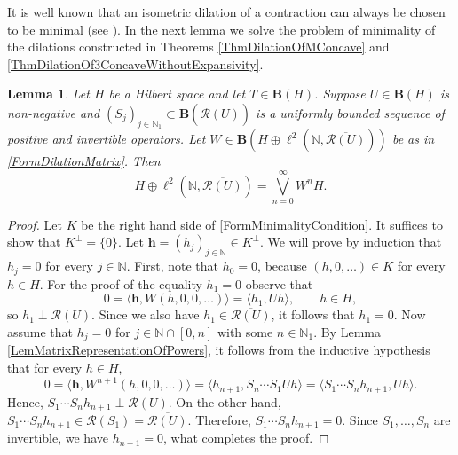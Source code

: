 \documentclass{amsart}
\newtheorem{lemma}[theorem]{Lemma}
\theoremstyle{definition}
\numberwithin{equation}{section}
\begin{document}
It is well known that an isometric dilation of a contraction can always be chosen to be minimal (see \cite[Chapter I, Theorem 4.1]{SzNagyHarmonicAnalysisOfOperators}). In the next lemma we solve the problem of minimality of the dilations constructed in Theorems \ref{ThmDilationOfMConcave} and \ref{ThmDilationOf3ConcaveWithoutExpansivity}.
\begin{lemma}
    \label{LemMinimalDilations}
    Let $ H $ be a Hilbert space and let $ T\in \mathbf{B}(H) $. Suppose $ U\in \mathbf{B}(H) $ is non-negative and $ (S_{j})_{j\in \mathbb{N}_{1}}\subset \mathbf{B}(\overline{\mathcal{R}(U)}) $ is a uniformly bounded sequence of positive and invertible operators. Let $ W\in \mathbf{B}\left( H\oplus \ell^{2}(\mathbb{N},\overline{\mathcal{R}(U)})  \right) $ be as in \eqref{FormDilationMatrix}. Then
    \begin{equation}
        \label{FormMinimalityCondition}
        H\oplus \ell^{2}(\mathbb{N},\overline{\mathcal{R}(U)}) = \bigvee_{n=0}^{\infty} W^{n}H.
    \end{equation}
\end{lemma}
\begin{proof}
    Let $ K $ be the right hand side of \eqref{FormMinimalityCondition}. It suffices to show that $ K^{\perp} = \{0\} $. Let $ \mathbf{h} = (h_{j})_{j\in \mathbb{N}}\in K^{\perp} $. We will prove by induction that $ h_{j} = 0 $ for every $ j\in \mathbb{N} $. First, note that $ h_{0} = 0 $, because $ (h,0,\ldots) \in K $ for every $ h\in H $. For the proof of the equality $ h_{1} = 0 $ observe that
    \begin{equation*}
        0 = \langle \mathbf{h}, W(h,0,0,\ldots)\rangle = \langle h_{1},Uh\rangle, \qquad h\in H,
    \end{equation*}
    so $ h_{1}\perp \mathcal{R}(U) $. Since we also have $ h_{1}\in \overline{\mathcal{R}(U)} $, it follows that $ h_{1} = 0 $. Now assume that $ h_{j} = 0 $ for $ j\in \mathbb{N}\cap[0,n] $ with some $ n\in \mathbb{N}_{1} $. By Lemma \ref{LemMatrixRepresentationOfPowers}, it follows from the inductive hypothesis that for every $ h\in H $,
    \begin{equation*}
        0 = \langle \mathbf{h}, W^{n+1}(h,0,0,\ldots)\rangle = \langle h_{n+1},S_{n}\cdots S_{1}Uh\rangle = \langle S_{1}\cdots S_{n}h_{n+1},Uh\rangle.
    \end{equation*}
    Hence, $ S_{1}\cdots S_{n}h_{n+1}\perp \mathcal{R}(U) $. On the other hand, $ S_{1}\cdots S_{n}h_{n+1}\in \mathcal{R}(S_{1}) = \overline{\mathcal{R}(U)} $. Therefore, $ S_{1}\cdots S_{n}h_{n+1} = 0 $. Since $ S_{1},\ldots,S_{n} $ are invertible, we have $ h_{n+1} = 0 $, what completes the proof.
\end{proof}
\end{document}
